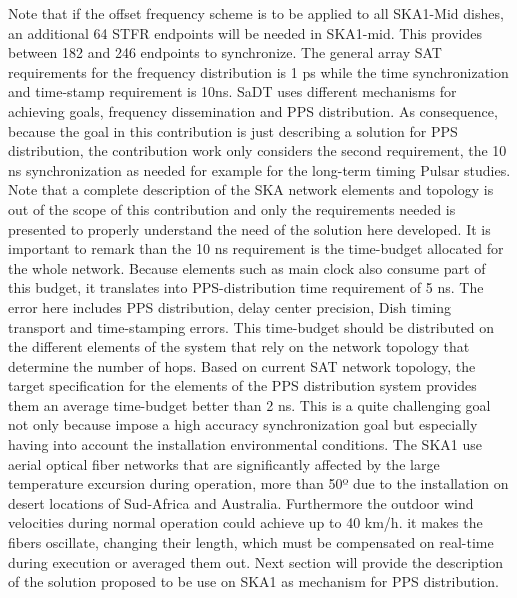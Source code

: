 Note that if the offset frequency scheme is to be applied to all SKA1-Mid dishes, an additional 64 STFR endpoints will be needed in SKA1-mid. This provides between 182 and 246 endpoints to synchronize. 
The general array SAT requirements for the frequency distribution is 1 ps while the time synchronization and time-stamp requirement is 10ns. SaDT uses different mechanisms for achieving goals, frequency dissemination and PPS distribution. As consequence, because the goal in this contribution is just describing a solution for PPS distribution, the contribution work only considers the second requirement, the 10 ns synchronization as needed for example for the long-term timing Pulsar studies. Note that a complete description of the SKA network elements and topology is out of the scope of this contribution and only the requirements needed is presented to properly understand the need of the solution here developed. 
It is important to remark than the 10 ns requirement is the time-budget allocated for the whole network. Because elements such as main clock also consume part of this budget, it translates into PPS-distribution time requirement of 5 ns. The error here includes PPS distribution, delay center precision, Dish timing transport and time-stamping errors. This time-budget should be distributed on the different elements of the system that rely on the network topology that determine the number of hops. Based on current SAT network topology, the target specification for the elements of the PPS distribution system provides them an average time-budget better than 2 ns. This is a quite challenging goal not only because impose a high accuracy synchronization goal but especially having into account the installation environmental conditions. The SKA1 use aerial optical fiber networks that are significantly affected by the large temperature excursion during operation, more than 50º due to the installation on desert locations of Sud-Africa and Australia. Furthermore the outdoor wind velocities during normal operation could achieve up to 40 km/h. it makes the fibers oscillate, changing their length, which must be compensated on real-time during execution or averaged them out. 
Next section will provide the description of the solution proposed to be use on SKA1 as mechanism for PPS distribution. 
